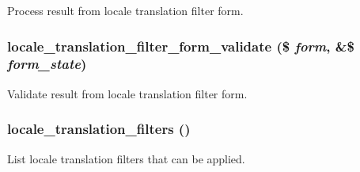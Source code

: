\label{group__locale_gac578de2fae636045173446f2aa26bd0f}
Process result from locale translation filter form. \hypertarget{group__locale_ga853ff354fb4c4c637123251916ccb4ae}{
\subsubsection[{locale\_\-translation\_\-filter\_\-form\_\-validate}]{\setlength{\rightskip}{0pt plus 5cm}locale\_\-translation\_\-filter\_\-form\_\-validate (\$ {\em form}, \/  \&\$ {\em form\_\-state})}}
\label{group__locale_ga853ff354fb4c4c637123251916ccb4ae}
Validate result from locale translation filter form. \hypertarget{group__locale_gacc11c165dc42516edefdca5eab092a28}{
\subsubsection[{locale\_\-translation\_\-filters}]{\setlength{\rightskip}{0pt plus 5cm}locale\_\-translation\_\-filters ()}}
\label{group__locale_gacc11c165dc42516edefdca5eab092a28}
List locale translation filters that can be applied. 